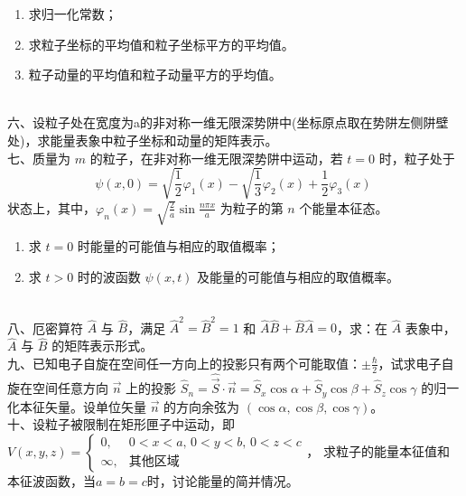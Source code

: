 \begin{enumerate}
    \item 求归一化常数；
    \item 求粒子坐标的平均值和粒子坐标平方的平均值。
    \item 粒子动量的平均值和粒子动量平方的乎均值。
\end{enumerate}\\
六、设粒子处在宽度为a的非对称一维无限深势阱中(坐标原点取在势阱左侧阱壁处)，求能量表象中粒子坐标和动量的矩阵表示。\\
七、质量为 $m$ 的粒子，在非对称一维无限深势阱中运动，若 $t=0$ 时，粒子处于
\[
\psi(x,0) = \sqrt{\frac{1}{2}} \varphi_1(x) - \sqrt{\frac{1}{3}} \varphi_2(x) + \frac{1}{2} \varphi_3(x)~
\]
状态上，其中，$\varphi_n(x) = \sqrt{\frac{2}{a}} \sin \frac{n\pi x}{a}$ 为粒子的第 $n$ 个能量本征态。

\begin{enumerate}
    \item 求 $t=0$ 时能量的可能值与相应的取值概率；
    \item 求 $t>0$ 时的波函数 $\psi(x,t)$ 及能量的可能值与相应的取值概率。
\end{enumerate}\\
八、厄密算符 $\hat{A}$ 与 $\hat{B}$，满足 $\hat{A}^2 = \hat{B}^2 = 1$ 和 $\hat{A}\hat{B} + \hat{B}\hat{A} = 0$，求：在 $\hat{A}$ 表象中，$\hat{A}$ 与 $\hat{B}$ 的矩阵表示形式。\\
九、已知电子自旋在空间任一方向上的投影只有两个可能取值：$\pm \frac{\hbar}{2}$，试求电子自旋在空间任意方向 $\vec{n}$ 上的投影 $\hat S_n = \hat{\vec{S}} \cdot \vec{n} =\hat S_x \cos \alpha + \hat S_y \cos \beta + \hat S_z \cos \gamma$ 的归一化本征矢量。设单位矢量 $\vec{n}$ 的方向余弦为 $(\cos \alpha, \cos \beta, \cos \gamma)$。\\
十、设粒子被限制在矩形匣子中运动，即 $V(x,y,z) = 
\begin{cases} 
0, & 0 < x < a, \, 0 < y < b, \, 0 < z < c \\
\infty, & \text{其他区域}
\end{cases}$，
求粒子的能量本征值和本征波函数，当$a=b=c$时，讨论能量的简并情况。